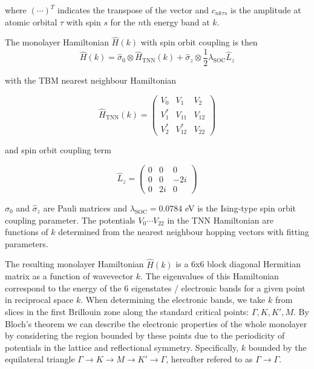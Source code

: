 \documentclass[12pt]{report} %
\begin{document}
  where $(\cdots)^T$ indicates the transpose of the vector and $c_{nk\tau s}$ is the amplitude at atomic orbital $\tau$ with spin $s$ for the $n$th energy band at $k$.

  The monolayer Hamiltonian $\hat{H}(k)$ with spin orbit coupling is then 
      \begin{equation}
        \hat{H}(k)=\hat{\sigma}_{0} \otimes \hat{H}_{\mathrm{TNN}}(k)+\hat{\sigma}_{z} \otimes \frac{1}{2} \lambda_{\mathrm{SOC}} \hat{L}_{z}
        \label{monolayer_hamitonian}
      \end{equation}

  with the TBM nearest neighbour Hamiltonian

      \begin{equation}
        \hat{H}_{\mathrm{TNN}}(k)=\left(\begin{array}{ccc}
        V_{0} & V_{1} & V_{2} \\
        V_{1}^{*} & V_{11} & V_{12} \\
        V_{2}^{*} & V_{12}^{*} & V_{22}
        \end{array}\right)
      \end{equation}

  and spin orbit coupling term

      \begin{equation}
        \hat{L}_{z}=\left(\begin{array}{ccc}
        0 & 0 & 0 \\
        0 & 0 & -2 i \\
        0 & 2 i & 0
        \end{array}\right)
      \end{equation}

  $\hat{\sigma}_0$ and $\hat{\sigma}_z$ are Pauli matrices and $\lambda_{\text{SOC}}=0.0784$ eV is the Ising-type spin orbit coupling parameter. The potentials $V_0 \cdots V_{22}$ in the TNN Hamiltonian are functions of $k$ determined from the nearest neighbour hopping vectors with fitting parameters.

  The resulting monolayer Hamiltonian $\hat{H}(k)$ is a 6x6 block diagonal Hermitian matrix as a function of wavevector $k$. The eigenvalues of this Hamiltonian correspond to the energy of the 6 eigenstates / electronic bands for a given point in reciprocal space $k$. When determining the electronic bands, we take $k$ from slices in the first Brillouin zone along the standard critical points: $\Gamma, K, K', M$. By Bloch's theorem we can describe the electronic properties of the whole monolayer by considering the region bounded by these points due to the periodicity of potentials in the lattice and reflectional symmetry. Specifically, $k$ bounded by the equilateral triangle $\Gamma \rightarrow K \rightarrow M \rightarrow K' \rightarrow \Gamma$, hereafter refered to as $\Gamma \rightarrow \Gamma$.
\end{document}
